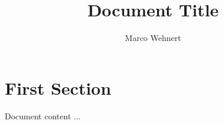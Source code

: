\documentclass{stddoc}
\author{Marco Wehnert}
\title{Document Title}
\begin{document}
\maketitle

\tableofcontents

\section{First Section}

Document content ...
\end{document}
